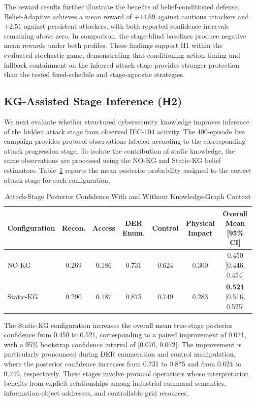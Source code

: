 \documentclass[10pt,conference]{IEEEtran}
\begin{document}
The reward results further illustrate the benefits of belief-conditioned defense. Belief-Adaptive achieves a mean reward of $+14.69$ against cautious attackers and $+2.51$ against persistent attackers, with both reported confidence intervals remaining above zero. In comparison, the stage-blind baselines produce negative mean rewards under both profiles. These findings support H1 within the evaluated stochastic game, demonstrating that conditioning action timing and fallback containment on the inferred attack stage provides stronger protection than the tested fixed-schedule and stage-agnostic strategies.

\subsection{KG-Assisted Stage Inference (H2)}

We next evaluate whether structured cybersecurity knowledge improves inference of the hidden attack stage from observed IEC-104 activity. The 400-episode live campaign provides protocol observations labeled according to the corresponding attack progression stage. To isolate the contribution of static knowledge, the same observations are processed using the NO-KG and Static-KG belief estimators. Table~\ref{tab:h2_stage_results} reports the mean posterior probability assigned to the correct attack stage for each configuration.

\begin{table}[t]
\centering
\caption{Attack-Stage Posterior Confidence With and Without Knowledge-Graph Context}
\label{tab:h2_stage_results}
\footnotesize
\begin{tabular}{lcccccc}
\hline
\textbf{Configuration} & \textbf{Recon.} & \textbf{Access} &
\textbf{DER Enum.} & \textbf{Control} &
\textbf{Physical Impact} & \textbf{Overall Mean [95\% CI]} \\
\hline
NO-KG & 0.269 & 0.186 & 0.731 & 0.624 & 0.300 & 0.450 [0.446, 0.454] \\
Static-KG & 0.290 & 0.187 & 0.875 & 0.749 & 0.283 & \textbf{0.521} [0.516, 0.525] \\
\hline
\end{tabular}
\end{table}

The Static-KG configuration increases the overall mean true-stage posterior confidence from 0.450 to 0.521, corresponding to a paired improvement of 0.071, with a 95\% bootstrap confidence interval of [0.070, 0.072]. The improvement is particularly pronounced during DER enumeration and control manipulation, where the posterior confidence increases from 0.731 to 0.875 and from 0.624 to 0.749, respectively. These stages involve protocol operations whose interpretation benefits from explicit relationships among industrial command semantics, information-object addresses, and controllable grid resources.
\end{document}
